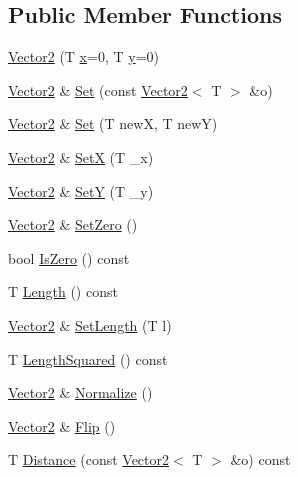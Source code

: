 \subsection*{Public Member Functions}
\begin{DoxyCompactItemize}
\item 
\hyperlink{classastu_1_1Vector2_a021ec0e80fa7ca80921a17172e30fe29}{Vector2} (T \hyperlink{classastu_1_1Vector2_aa60c30b27742255fbe7053b07a7e76ba}{x}=0, T \hyperlink{classastu_1_1Vector2_a6718f5a7005c38830dbd31283a87f5c9}{y}=0)
\item 
\hyperlink{classastu_1_1Vector2}{Vector2} \& \hyperlink{classastu_1_1Vector2_a303494be2ce5f334571f6f284ad13e28}{Set} (const \hyperlink{classastu_1_1Vector2}{Vector2}$<$ T $>$ \&o)
\item 
\hyperlink{classastu_1_1Vector2}{Vector2} \& \hyperlink{classastu_1_1Vector2_a0a30422e8f2bcdd161c6a98764e816b2}{Set} (T newX, T newY)
\item 
\hyperlink{classastu_1_1Vector2}{Vector2} \& \hyperlink{classastu_1_1Vector2_ad3bb5d95529930813f270b6425741364}{SetX} (T \+\_\+x)
\item 
\hyperlink{classastu_1_1Vector2}{Vector2} \& \hyperlink{classastu_1_1Vector2_a3241be81f52b56f822bb71def51f4075}{SetY} (T \+\_\+y)
\item 
\hyperlink{classastu_1_1Vector2}{Vector2} \& \hyperlink{classastu_1_1Vector2_a70eb8d4b44d3f973c5065a0ed5f9c01c}{Set\+Zero} ()
\item 
bool \hyperlink{classastu_1_1Vector2_a3834ea419b358f4db9df5dc9afe584f6}{Is\+Zero} () const
\item 
T \hyperlink{classastu_1_1Vector2_ab195006315ba4e54f6e89e01727dbd08}{Length} () const
\item 
\hyperlink{classastu_1_1Vector2}{Vector2} \& \hyperlink{classastu_1_1Vector2_afeae7c216e2c0846f576a11563a6404c}{Set\+Length} (T l)
\item 
T \hyperlink{classastu_1_1Vector2_a42ff8efbc4747ec1042867e30e565311}{Length\+Squared} () const
\item 
\hyperlink{classastu_1_1Vector2}{Vector2} \& \hyperlink{classastu_1_1Vector2_aedecfe4d0a04bb6e3b6dd94caa16e911}{Normalize} ()
\item 
\hyperlink{classastu_1_1Vector2}{Vector2} \& \hyperlink{classastu_1_1Vector2_ae158630c2e79eedbaa827967c57be805}{Flip} ()
\item 
T \hyperlink{classastu_1_1Vector2_a504029e7043988ec1e697b1a1e2cfb78}{Distance} (const \hyperlink{classastu_1_1Vector2}{Vector2}$<$ T $>$ \&o) const

\end{DoxyCompactItemize}
